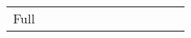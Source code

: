 \begin{longtable}{llcccccccccc}
Full \end{tabular}\\ \cmidrule(lr){3-5} \cmidrule(lr){7-9} \cmidrule(lr){10-12}       
                                                                                                                                                                                                                                                                                                                                                                                                                                                                                                                                                                                                                                                                                                                                                                                                                                                                                          

\end{longtable}
